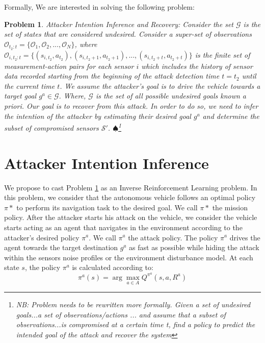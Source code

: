 \documentclass[letterpaper, 10 pt, conference]{ieeeconf}  %
\newtheorem{problem}{Problem}
\newcommand\NB[1]{$\spadesuit$\footnote{NB: #1}}
\begin{document}
Formally, We are interested in solving the following problem:
\begin{problem}\label{prob:p1}
Attacker Intention Inference and Recovery: Consider the set $\mathcal{G}$ is the set of states that are considered undesired. Consider a super-set of observations $\mathcal{O}_{t_2:t} = \{\mathcal{O}_1, \mathcal{O}_2, ..., \mathcal{O}_N\}$, where $\mathcal{O}_{i,t_2:t} = \{(s_{i,t_2}, a_{t_2}), (s_{i,t_2+1}, a_{t_2+1}), ..., (s_{i,t_2+t}, a_{t_2+t})\}$ is the finite set of measurement-action pairs for each sensor $i$ which includes the history of sensor data recorded starting from the beginning of the attack detection time  $t = t_2$ until the current time $t$. We assume the attacker's goal is to drive the vehicle towards a target goal $g^a \in \mathcal{G}$. Where, $\mathcal{G}$ is the set of all possible undesired goals known a priori. Our goal is to recover from this attack. In order to do so, we need to infer the intention of the attacker by estimating their desired goal $g^a$ and determine the subset of compromised sensors $\mathcal{S'}$. \NB{Problem needs to be rewritten more formally. Given a set of undesired goals...a set of observations/actions ... and assume that a subset of observations...is compromised at a certain time t, find a policy to predict the intended goal of the attack and recover the system}
\end{problem}

\section{Attacker Intention Inference}\label{sec:approach}
We propose to cast Problem \ref{prob:p1} as an Inverse Reinforcement Learning problem. In this problem, we consider that the autonomous vehicle follows an optimal policy $\pi*$ to perform its navigation task to the desired goal. We call $\pi*$ the mission policy. After the attacker starts his attack on the vehicle, we consider the vehicle starts acting as an agent that navigates in the environment according to the attacker's desired policy $\pi^a$. We call $\pi^a$ the attack policy. The policy $\pi^a$ drives the agent towards the target destination $g^a$ as fast as possible while hiding the attack within the sensors noise profiles or the environment disturbance model. At each state $s$, the policy $\pi^a$ is calculated according to:
\[ \pi^a(s) = \arg\!\max_{a\in A} Q^{\pi^a}(s,a,R^a)\]
\end{document}
